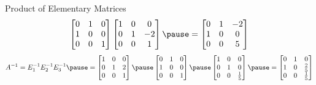 \documentclass[xcoler=dvipsnames, aspectratio=169]{beamer}
\begin{document}
\begin{frame}{Product of Elementary Matrices}
\[\begin{bmatrix}
                        0 & 1 & 0\\
                        1 & 0 & 0\\
                        0 & 0 & 1
                    \end{bmatrix}\begin{bmatrix}
                        1&0&0\\
                        0&1&-2\\
                        0&0&1
                    \end{bmatrix}\pause = \begin{bmatrix}
                        0&1&-2\\
                        1&0&0\\
                        0&0&5
                    \end{bmatrix}
            \]
            \pause
            \[
                A^{-1} = E_1^{-1}E_2^{-1}E^{-1}_3\pause = \begin{bmatrix}
                        1&0&0\\
                        0&1&2\\
                        0&0&1
                    \end{bmatrix}\pause\begin{bmatrix}
                        0 & 1 & 0\\
                        1 & 0 & 0\\
                        0 & 0 & 1
                    \end{bmatrix}\pause\begin{bmatrix}
                        1&0&0\\
                        0&1&0\\
                        0&0&\frac{1}{5}
                    \end{bmatrix}\pause = \begin{bmatrix}
                        0 & 1 & 0\\
                        1 & 0 & \frac{2}{5}\\
                        0 & 0 & \frac{1}{5}
                    \end{bmatrix}
            \]
    \end{frame}
\end{document}
